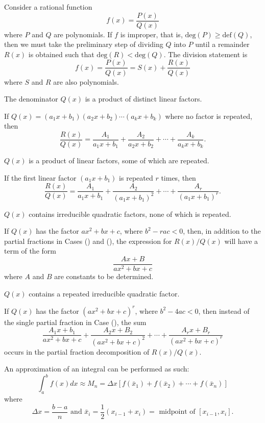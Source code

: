 \documentclass[a4paper,8pt]{article}
\begin{document}
\begin{outline}
    Consider a rational function \[f(x)=\frac{P(x)}{Q(x)}\] where \(P\) and \(Q\) are polynomials. If \(f\) is
    improper, that is, \(\text{deg}(P)\geq\text{def}(Q)\), then we must take the preliminary step of dividing
    \(Q\) into \(P\) until a remainder \(R(x)\) is obtained such that \(\text{deg}(R)<\text{deg}(Q)\). The division
    statement is \[f(x)=\frac{P(x)}{Q(x)}=S(x)+\frac{R(x)}{Q(x)}\] where \(S\) and \(R\) are also polynomials.

    \begin{proofcases}
      \item
        The denominator \(Q(x)\) is a product of distinct linear factors.

        If \(Q(x) = (a_1x+b_1)(a_2x+b_2)\cdots(a_kx+b_k)\) where no factor is repeated, then \[ \frac{R(x)}{Q(x)}
        = \frac{A_1}{a_1x+b_1} + \frac{A_2}{a_2x+b_2} + \cdots + \frac{A_k}{a_kx+b_k}\text{.} \]
      \item
        \(Q(x)\) is a product of linear factors, some of which are repeated.

        If the first linear factor \((a_1x+b_1)\) is repeated \(r\) times, then \[ \frac{R(x)}{Q(x)} =
        \frac{A_1}{a_1x+b_1} + \frac{A_2}{(a_1x+b_1)^2} + \cdots + \frac{A_r}{(a_1x+b_1)^r}\text{.} \]
      \item
        \(Q(x)\) contains irreducible quadratic factors, none of which is repeated.

        If \(Q(x)\) has the factor \(ax^2+bx+c\), where \(b^2-rac < 0\), then, in addition to the partial fractions
        in Cases () and (), the expression for \(R(x)/Q(x)\) will have a term
        of the form \[\frac{Ax+B}{ax^2+bx+c}\] where \(A\) and \(B\) are constants to be determined.
      \item
        \(Q(x)\) contains a repeated irreducible quadratic factor.

        If \(Q(x)\) has the factor \((ax^2+bx+c)^r\), where \(b^2-4ac < 0\), then instead of the single partial
        fraction in Case (), the sum \[\frac{A_1x+b_1}{ax^2+bx+c}+\frac{A_2x+B_2}{(ax^2+bx+c)^2}+
        \cdots+\frac{A_rx+B_r}{(ax^2+bx+c)^r}\] occurs in the partial fraction decomposition of \(R(x)/Q(x)\).

    \end{proofcases}

    An approximation of an integral can be performed as such:
    \[
      \int_a^bf(x)dx \approx M_n = \Delta{x}\left[f(\bar{x}_1) + f(\bar{x}_2) + \cdots + f(\bar{x}_n)\right]
    \]
    where
    \[
      \Delta{x}=\frac{b-a}{n}\text{ and }\bar{x}_i=\frac{1}{2}(x_{i-1}+x_i)=\text{ midpoint of }[x_{i-1}, x_i]\text{.}
    \]


\end{outline}
\end{document}
